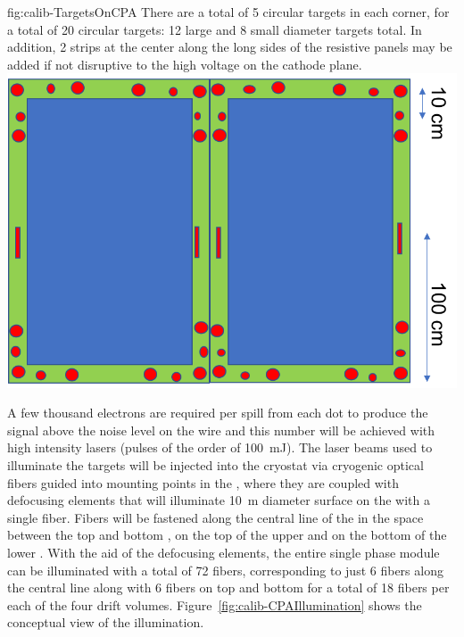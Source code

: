 \begin{dunefigure}{fig:calib-TargetsOnCPA}
{There are a total of 5 circular targets in each corner, for a total of 20 circular targets: 12 large and 8 small diameter targets total. In addition, 2 strips at the center along the long sides of the resistive panels may be added if not disruptive to the high voltage on the cathode plane.} 
\includegraphics[width=0.55\linewidth]{graphics/calib-TargetsOnCPA.png} 
\end{dunefigure}

A few thousand electrons are required per spill from each dot to produce the signal above the noise level on the wire and this number will be achieved with high intensity lasers (pulses of the order of \SI{100}{\milli\joule}). The laser beams used to illuminate the targets will be injected into the cryostat via cryogenic optical fibers guided into mounting points in the , where they are coupled with defocusing elements that will illuminate \SI{10}{\m} diameter surface on the   with a single fiber. Fibers will be fastened along the central line of the  in the space between the top and bottom , on the top of the upper  and on the bottom of the lower . With the aid of the defocusing elements, the entire single phase module can be illuminated with a total of \num{72} fibers, corresponding to just \num{6} fibers along the central line along with \num{6} fibers on top and bottom for a total of \num{18} fibers per each of the four drift volumes. Figure~\ref{fig:calib-CPAIllumination} shows the conceptual view of the  illumination.

